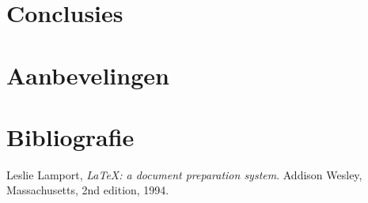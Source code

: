 \documentclass[twoside,openright,parskip]{scrreprt}
\begin{document}
\lipsum

\chapter{Conclusies}

\lipsum

\chapter{Aanbevelingen}

\lipsum

\chapter{Bibliografie}

\begingroup
\renewcommand{\chapter}[2]{}
\begin{thebibliography}{9999}
  Leslie Lamport,
  \emph{\LaTeX: a document preparation system}.
  Addison Wesley, Massachusetts,
  2nd edition,
  1994.

\end{thebibliography}
\endgroup

\chapter{Index}

\begingroup
\renewcommand{\chapter}[2]{}
\printindex
\endgroup

\chapter{Verklarende woordenlijst}

\printglossaries
\end{document}
